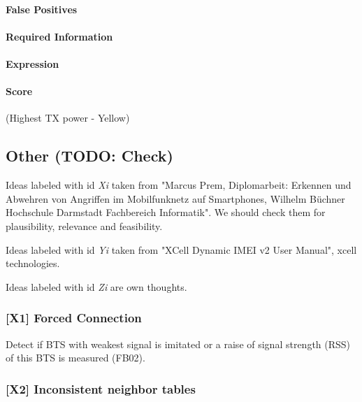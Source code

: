 \documentclass[a4paper,11pt,notitlepage,bigheadings,oneside]{scrartcl}
\begin{document}
\paragraph{False Positives}

\TBD{}

\paragraph{Required Information}

\TBD{}

\paragraph{Expression}

\TBD{}

\paragraph{Score}

\TBD{} (Highest TX power - Yellow)


\subsection{Other (TODO: Check)}

Ideas labeled with id \emph{Xi} taken from "Marcus Prem, Diplomarbeit: Erkennen
und Abwehren von Angriffen im Mobilfunknetz auf Smartphones, Wilhelm Büchner
Hochschule Darmstadt Fachbereich Informatik". We should check them for
plausibility, relevance and feasibility.

Ideas labeled with id \emph{Yi} taken from "XCell Dynamic IMEI v2 User Manual",
xcell technologies.

Ideas labeled with id \emph{Zi} are own thoughts.

\subsubsection{[X1] Forced Connection}

Detect if BTS with weakest signal is imitated or a  raise of signal strength
(RSS) of this BTS is measured (FB02).

\subsubsection{[X2] Inconsistent neighbor tables}
\end{document}
